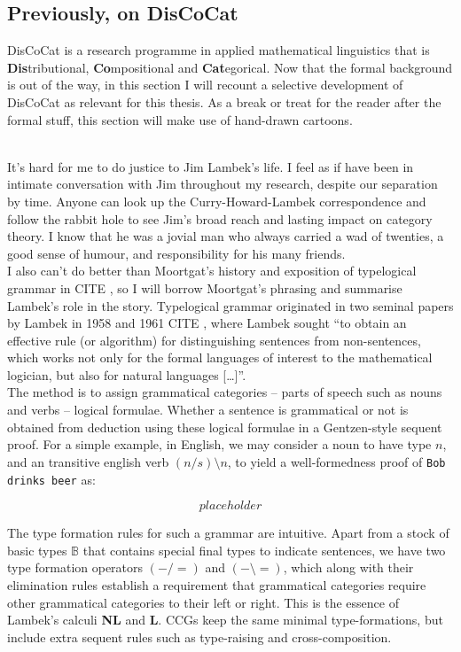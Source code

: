 \begin{fullwidth}
\section{Previously, on DisCoCat}

DisCoCat is a research programme in applied mathematical linguistics that is \textbf{Dis}tributional, \textbf{Co}mpositional and \textbf{Cat}egorical. Now that the formal background is out of the way, in this section I will recount a selective development of DisCoCat as relevant for this thesis. As a break or treat for the reader after the formal stuff, this section will make use of hand-drawn cartoons.

\\

It's hard for me to do justice to Jim Lambek's life. I feel as if have been in intimate conversation with Jim throughout my research, despite our separation by time. Anyone can look up the Curry-Howard-Lambek correspondence and follow the rabbit hole to see Jim's broad reach and lasting impact on category theory. I know that he was a jovial man who always carried a wad of twenties, a good sense of humour, and responsibility for his many friends.\\

I also can't do better than Moortgat's history and exposition of typelogical grammar in \bR CITE \e, so I will borrow Moortgat's phrasing and summarise Lambek's role in the story. Typelogical grammar originated in two seminal papers by Lambek in 1958 and 1961 \bR CITE \e, where Lambek sought “to obtain an effective rule (or algorithm) for distinguishing sentences from non-sentences, which works not only for the formal languages of interest to the mathematical logician, but also for natural languages […]”.\\

The method is to assign grammatical categories -- parts of speech such as nouns and verbs -- logical formulae. Whether a sentence is grammatical or not is obtained from deduction using these logical formulae in a Gentzen-style sequent proof. For a simple example, in English, we may consider a noun to have type $n$, and an transitive english verb $(n/s)\setminus n$, to yield a well-formedness proof of \texttt{Bob drinks beer} as:

\[placeholder\]

The type formation rules for such a grammar are intuitive. Apart from a stock of basic types $\mathbb{B}$ that contains special final types to indicate sentences, we have two type formation operators $(-/=)$ and $(- \setminus =)$, which along with their elimination rules establish a requirement that grammatical categories require other grammatical categories to their left or right. This is the essence of Lambek's calculi \textbf{NL} and \textbf{L}. CCGs keep the same minimal type-formations, but include extra sequent rules such as type-raising and cross-composition.\\


\end{fullwidth}
